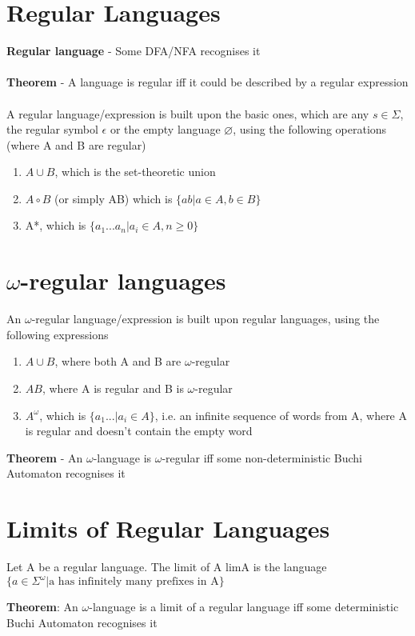 \documentclass{article}[18pt]
\begin{document}
\section{Regular Languages}
\textbf{Regular language} - Some DFA/NFA recognises it\\
\\
\textbf{Theorem} - A language is regular iff it could be described by a regular expression\\
\\
A regular language/expression is built upon the basic ones, which are any $s\in \Sigma$, the regular symbol $\epsilon$ or the empty language $\varnothing$, using the following operations (where A and B are regular)
\begin{enumerate}
	\item $A\cup B$, which is the set-theoretic union
	\item $A\circ B$ (or simply AB) which is $\{ab| a\in A, b\in B\}$
	\item A*, which is $\{a_1...a_n|a_i\in A, n\geqslant 0\}$
\end{enumerate}
\section{$\omega$-regular languages}
\begin{definition}
An $\omega$-regular language/expression is built upon regular languages, using the following expressions
\begin{enumerate}
	\item $A\cup B$, where both A and B are $\omega$-regular
	\item $AB$, where A is regular and B is $\omega$-regular
	\item $A^\omega$, which is $\{a_1...| a_i\in A\}$, i.e. an infinite sequence of words from A, where A is regular and doesn't contain the empty word
\end{enumerate}
\end{definition}
\textbf{Theorem} - An $\omega$-language is $\omega$-regular iff some non-deterministic Buchi Automaton recognises it
\section{Limits of Regular Languages}
\begin{definition}
Let A be a regular language. The limit of A limA is the language $\{a\in \Sigma^\omega| \text{a has infinitely many prefixes in A}\}$
\end{definition}

\textbf{Theorem}: An $\omega$-language is a limit of a regular language iff some deterministic Buchi Automaton recognises it
\end{document}
